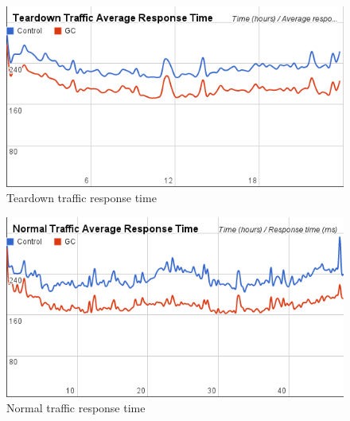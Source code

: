 \documentclass[12pt]{ucthesis}
\begin{document}
\begin{figure}[htp]
\centering
\includegraphics[width=\textwidth]{assets/teardownRespTimeXTime.png}
\caption{Teardown traffic response time}
\label{fig:teardownRespTimeXTime}
\end{figure}
\begin{figure}[htp]
\centering
\includegraphics[width=\textwidth]{assets/normalRespTimeXTime.png}
\caption{Normal traffic response time}
\label{fig:normalRespTimeXTime}
\end{figure}
\end{document}
